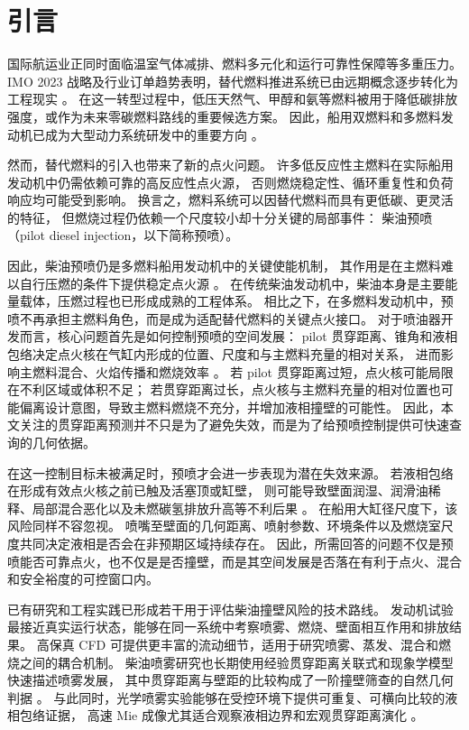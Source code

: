 \section{引言}

国际航运业正同时面临温室气体减排、燃料多元化和运行可靠性保障等多重压力。
IMO 2023 战略及行业订单趋势表明，替代燃料推进系统已由远期概念逐步转化为工程现实
\cite{imo2023ghgstrategy,classnk2025alternativefuels}。
在这一转型过程中，低压天然气、甲醇和氨等燃料被用于降低碳排放强度，或作为未来零碳燃料路线的重要候选方案。
因此，船用双燃料和多燃料发动机已成为大型动力系统研发中的重要方向
\cite{wingd_lng_faq_2025,wingd_ammonia_faq_2025,classnk_methanol_2024}。

然而，替代燃料的引入也带来了新的点火问题。
许多低反应性主燃料在实际船用发动机中仍需依赖可靠的高反应性点火源，
否则燃烧稳定性、循环重复性和负荷响应均可能受到影响。
换言之，燃料系统可以因替代燃料而具有更低碳、更灵活的特征，
但燃烧过程仍依赖一个尺度较小却十分关键的局部事件：
柴油预喷（pilot diesel injection，以下简称预喷）。

因此，柴油预喷仍是多燃料船用发动机中的关键使能机制，
其作用是在主燃料难以自行压燃的条件下提供稳定点火源
\cite{wingd_xdf_manual_2021,classnk_methanol_2024}。
在传统柴油发动机中，柴油本身是主要能量载体，压燃过程也已形成成熟的工程体系。
相比之下，在多燃料发动机中，预喷不再承担主燃料角色，而是成为适配替代燃料的关键点火接口。
对于喷油器开发而言，核心问题首先是如何控制预喷的空间发展：
pilot 贯穿距离、锥角和液相包络决定点火核在气缸内形成的位置、尺度和与主燃料充量的相对关系，
进而影响主燃料混合、火焰传播和燃烧效率
\cite{Karim2015DualFuel,WeiGeng2016DualFuelReview,Sahoo2009DualFuelReview}。
若 pilot 贯穿距离过短，点火核可能局限在不利区域或体积不足；
若贯穿距离过长，点火核与主燃料充量的相对位置也可能偏离设计意图，导致主燃料燃烧不充分，并增加液相撞壁的可能性。
因此，本文关注的贯穿距离预测并不只是为了避免失效，而是为了给预喷控制提供可快速查询的几何依据。

在这一控制目标未被满足时，预喷才会进一步表现为潜在失效来源。
若液相包络在形成有效点火核之前已触及活塞顶或缸壁，
则可能导致壁面润湿、润滑油稀释、局部混合恶化以及未燃碳氢排放升高等不利后果
\cite{peraza2022swi,ahmad2025fueldilution,MorieiraMotaPanao2010}。
在船用大缸径尺度下，该风险同样不容忽视。
喷嘴至壁面的几何距离、喷射参数、环境条件以及燃烧室尺度共同决定液相是否会在非预期区域持续存在。
因此，所需回答的问题不仅是预喷能否可靠点火，也不仅是是否撞壁，而是其空间发展是否落在有利于点火、混合和安全裕度的可控窗口内。

已有研究和工程实践已形成若干用于评估柴油撞壁风险的技术路线。
发动机试验最接近真实运行状态，能够在同一系统中考察喷雾、燃烧、壁面相互作用和排放结果。
高保真 CFD 可提供更丰富的流动细节，适用于研究喷雾、蒸发、混合和燃烧之间的耦合机制。
柴油喷雾研究也长期使用经验贯穿距离关联式和现象学模型快速描述喷雾发展，
其中贯穿距离与壁距的比较构成了一阶撞壁筛查的自然几何判据
\cite{HiroyasuArai1990,NaberSiebers1996,Baumgarten2006MixFormation}。
与此同时，光学喷雾实验能够在受控环境下提供可重复、可横向比较的液相包络证据，
高速 Mie 成像尤其适合观察液相边界和宏观贯穿距离演化 \cite{Linne2013SprayImaging}。

